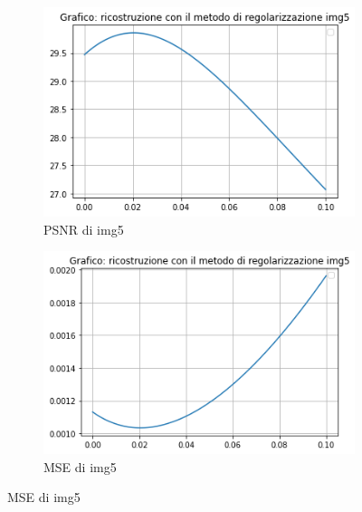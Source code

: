 \begin{figure}[H]
    \begin{subfigure}{0.5\textwidth}
        \centering
        \includegraphics[width=\textwidth]{output/PSNR/outputPSNR-img5.png}
        \caption{PSNR di img5}
        \label{fig:img5PSNR}
    \end{subfigure}\hfill
    \begin{subfigure}{0.5\textwidth}
        \centering
        \includegraphics[width=\textwidth]{output/MSE/outputMSE-img5.png}
        \caption{MSE di img5}
        \label{fig:img5MSE}
    \end{subfigure}


\end{figure}
